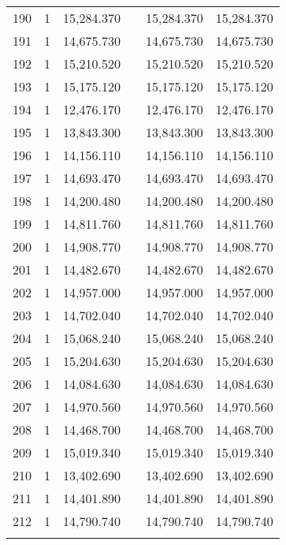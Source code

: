 \begin{table}[!htbp]
\begin{tabular}{@{\extracolsep{5pt}}lccccc}
190 & 1 & 15,284.370 &  & 15,284.370 & 15,284.370 \\ 
191 & 1 & 14,675.730 &  & 14,675.730 & 14,675.730 \\ 
192 & 1 & 15,210.520 &  & 15,210.520 & 15,210.520 \\ 
193 & 1 & 15,175.120 &  & 15,175.120 & 15,175.120 \\ 
194 & 1 & 12,476.170 &  & 12,476.170 & 12,476.170 \\ 
195 & 1 & 13,843.300 &  & 13,843.300 & 13,843.300 \\ 
196 & 1 & 14,156.110 &  & 14,156.110 & 14,156.110 \\ 
197 & 1 & 14,693.470 &  & 14,693.470 & 14,693.470 \\ 
198 & 1 & 14,200.480 &  & 14,200.480 & 14,200.480 \\ 
199 & 1 & 14,811.760 &  & 14,811.760 & 14,811.760 \\ 
200 & 1 & 14,908.770 &  & 14,908.770 & 14,908.770 \\ 
201 & 1 & 14,482.670 &  & 14,482.670 & 14,482.670 \\ 
202 & 1 & 14,957.000 &  & 14,957.000 & 14,957.000 \\ 
203 & 1 & 14,702.040 &  & 14,702.040 & 14,702.040 \\ 
204 & 1 & 15,068.240 &  & 15,068.240 & 15,068.240 \\ 
205 & 1 & 15,204.630 &  & 15,204.630 & 15,204.630 \\ 
206 & 1 & 14,084.630 &  & 14,084.630 & 14,084.630 \\ 
207 & 1 & 14,970.560 &  & 14,970.560 & 14,970.560 \\ 
208 & 1 & 14,468.700 &  & 14,468.700 & 14,468.700 \\ 
209 & 1 & 15,019.340 &  & 15,019.340 & 15,019.340 \\ 
210 & 1 & 13,402.690 &  & 13,402.690 & 13,402.690 \\ 
211 & 1 & 14,401.890 &  & 14,401.890 & 14,401.890 \\ 
212 & 1 & 14,790.740 &  & 14,790.740 & 14,790.740 \\ 
\hline \\[-1.8ex] 
\end{tabular} 
\end{table} 
